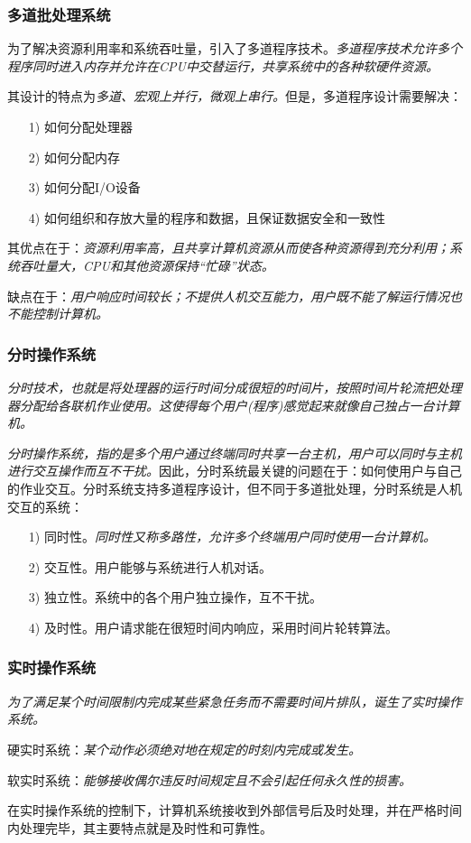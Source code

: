 \subsubsection{多道批处理系统}

    为了解决资源利用率和系统吞吐量，引入了多道程序技术。\emph{多道程序技术允许多个程序同时进入内存并允许在CPU中交替运行，共享系统中的各种软硬件资源。}

    其设计的特点为\emph{多道、{\color{red}宏观上并行，微观上串行。}}但是，多道程序设计需要解决：

\begin{itemize}
    \item [1)] 如何分配处理器
    \item [2)] 如何分配内存
    \item [3)] 如何分配I/O设备
    \item [4)] 如何组织和存放大量的程序和数据，且保证数据安全和一致性
\end{itemize}

    其优点在于：\emph{资源利用率高，且共享计算机资源从而使各种资源得到充分利用；系统吞吐量大，CPU和其他资源保持“忙碌”状态。}

    缺点在于：\emph{用户响应时间较长；不提供人机交互能力，用户既不能了解运行情况也不能控制计算机。}

\subsubsection{分时操作系统}

    \emph{分时技术，也就是将处理器的运行时间分成很短的时间片，按照时间片轮流把处理器分配给各联机作业使用。{\color{red}这使得每个用户(程序)感觉起来就像自己独占一台计算机}。}

    \emph{分时操作系统，指的是多个用户通过终端同时共享一台主机，用户可以同时与主机进行交互操作而互不干扰。}因此，分时系统最关键的问题在于：{\color{red}如何使用户与自己的作业交互}。分时系统支持多道程序设计，但不同于多道批处理，分时系统是人机交互的系统：

\begin{itemize}
    \item [1)] 同时性。\emph{同时性又称多路性，允许多个终端用户同时使用一台计算机。}
    \item [2)] 交互性。用户能够与系统进行人机对话。
    \item [3)] 独立性。系统中的各个用户独立操作，互不干扰。
    \item [4)] 及时性。用户请求能在很短时间内响应，采用时间片轮转算法。
\end{itemize}

\subsubsection{实时操作系统}

    \emph{为了满足某个时间限制内完成某些紧急任务而不需要时间片排队，诞生了实时操作系统。}

    硬实时系统：\emph{某个动作必须绝对地在规定的时刻内完成或发生。}

    软实时系统：\emph{能够接收偶尔违反时间规定且不会引起任何永久性的损害。}

    在实时操作系统的控制下，计算机系统接收到外部信号后及时处理，并在严格时间内处理完毕，其主要特点就是{\color{red}及时性和可靠性}。

